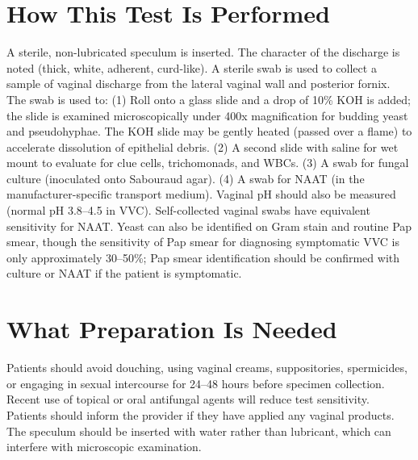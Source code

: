 \section*{How This Test Is Performed}
A sterile, non-lubricated speculum is inserted. The character of the discharge is noted (thick, white, adherent, curd-like). A sterile swab is used to collect a sample of vaginal discharge from the lateral vaginal wall and posterior fornix. The swab is used to: (1) Roll onto a glass slide and a drop of 10\% KOH is added; the slide is examined microscopically under 400x magnification for budding yeast and pseudohyphae. The KOH slide may be gently heated (passed over a flame) to accelerate dissolution of epithelial debris. (2) A second slide with saline for wet mount to evaluate for clue cells, trichomonads, and WBCs. (3) A swab for fungal culture (inoculated onto Sabouraud agar). (4) A swab for NAAT (in the manufacturer-specific transport medium). Vaginal pH should also be measured (normal pH 3.8--4.5 in VVC). Self-collected vaginal swabs have equivalent sensitivity for NAAT. Yeast can also be identified on Gram stain and routine Pap smear, though the sensitivity of Pap smear for diagnosing symptomatic VVC is only approximately 30--50\%; Pap smear identification should be confirmed with culture or NAAT if the patient is symptomatic.

\section*{What Preparation Is Needed}
Patients should avoid douching, using vaginal creams, suppositories, spermicides, or engaging in sexual intercourse for 24--48 hours before specimen collection. Recent use of topical or oral antifungal agents will reduce test sensitivity. Patients should inform the provider if they have applied any vaginal products. The speculum should be inserted with water rather than lubricant, which can interfere with microscopic examination.

